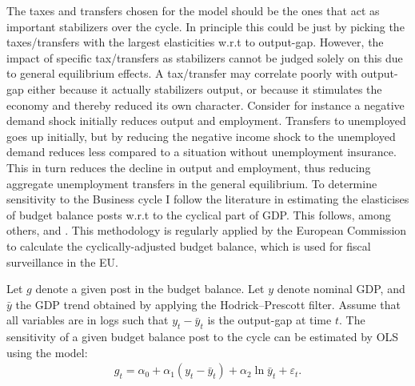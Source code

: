 



The taxes and transfers chosen for the model should be the ones that act as important stabilizers over the cycle. In principle this could be just by picking the taxes/transfers with the largest elasticities w.r.t to output-gap. However, the impact of specific tax/transfers as stabilizers cannot be judged solely on this due to general equilibrium effects. A tax/transfer may correlate poorly with output-gap either because it actually stabilizers output, or because it stimulates the economy and thereby reduced its own character. Consider for instance a negative demand shock initially reduces output and employment. Transfers to unemployed goes up initially, but by reducing the negative income shock to the unemployed demand reduces less compared to a situation without unemployment insurance. This in turn reduces the decline in output and employment, thus reducing aggregate unemployment transfers in the general equilibrium.     
To determine sensitivity to the Business cycle I follow the literature in estimating the elasticises of budget balance posts w.r.t to the cyclical part of GDP. This follows, among others, \citet{cohen1999automatic} and
\citet{mourre2014adjusting}. This methodology is regularly applied by the 
European Commission to calculate the cyclically-adjusted budget balance, which is used for fiscal surveillance in the EU.  

Let $g$ denote a given post in the budget balance. Let $y$ denote nominal GDP, and $\bar{y}$ the GDP trend obtained by applying the Hodrick–Prescott filter. Assume that all variables are in logs such that $y_t - \bar{y}_{t}$ is the output-gap at time $t$. The sensitivity of a given budget balance post to the cycle can be estimated by OLS using the model: 
\begin{gather*}
g_{t}=\alpha_{0}+\alpha_{1}\left(y_{t}-\bar{y}_{t}\right)+\alpha_{2}\ln\bar{y}_{t}+\varepsilon_{t}.   
\end{gather*}



